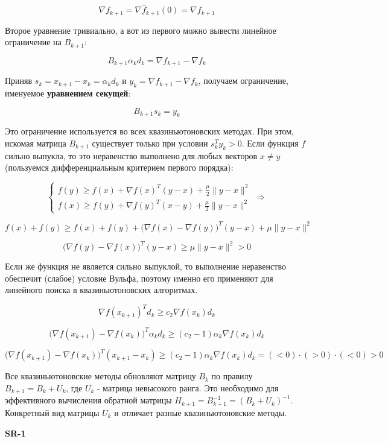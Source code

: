 $$
\nabla f_{k+1} = \nabla \widehat{f}_{k + 1}(0) = \nabla f_{k+1}
$$

\noindent
Второе уравнение тривиально, а вот из первого можно вывести линейное ограничение на $B_{k+1}$:

$$
B_{k+1} \alpha_k d_k = \nabla f_{k+1} - \nabla f_k
$$

Приняв $s_k = x_{k+1} - x_k = \alpha_k d_k$ и $y_k = \nabla f_{k+1} - \nabla f_k$, получаем ограничение, именуемое \textbf{уравнением секущей}:

$$
B_{k+1} s_k = y_k
$$

\noindent
Это ограничение используется во всех квазиньютоновских методах. При этом, искомая матрица $B_{k+1}$ существует только при условии $s_k^T y_k > 0$. Если функция $f$ сильно выпукла, то это неравенство выполнено для любых векторов $x \ne y$ (пользуемся дифференциальным критерием первого порядка):

$$
\begin{cases}
    f(y) \ge f(x) + \nabla f(x)^T (y - x) + \frac{\mu}{2} \|y - x\|^2 \\
    f(x) \ge f(y) + \nabla f(y)^T (x - y) + \frac{\mu}{2} \|y - x\|^2
\end{cases} \Rightarrow
$$

$$
f(x) + f(y) \ge f(x) + f(y) + \big(\nabla f(x) - \nabla f(y)\big)^T (y - x) + \mu \|y - x\|^2
$$

$$
\big(\nabla f(y) - \nabla f(x)\big)^T (y - x) \ge \mu \|y - x\|^2 > 0
$$

\noindent
Если же функция не является сильно выпуклой, то выполнение неравенство обеспечит (слабое) условие Вульфа, поэтому именно его применяют для линейного поиска в квазиньютоновских алгоритмах.

$$
\nabla f(x_{k+1})^T d_k \ge c_2 \nabla f(x_k) d_k
$$

$$
\big(\nabla f(x_{k+1}) - \nabla f(x_k)\big)^T \alpha_k d_k \ge (c_2 - 1) \alpha_k  \nabla f(x_k) d_k
$$

$$
\big(\nabla f(x_{k+1}) - \nabla f(x_k)\big)^T (x_{k+1} - x_k) \ge (c_2 - 1) \alpha_k \nabla f(x_k) d_k = (< 0) \cdot (> 0) \cdot (< 0) > 0
$$

Все квазиньютоновские методы обновляют матрицу $B_k$ по правилу $B_{k+1} = B_k + U_k$, где $U_k$ - матрица невысокого ранга. Это необходимо для эффективного вычисления обратной матрицы $H_{k + 1} = B_{k+1}^{-1} = \left(B_k + U_k \right)^{-1}$. Конкретный вид матрицы $U_k$ и отличает разные квазиньютоновские методы.

\vspace{6pt}
\textbf{\large SR-1}

